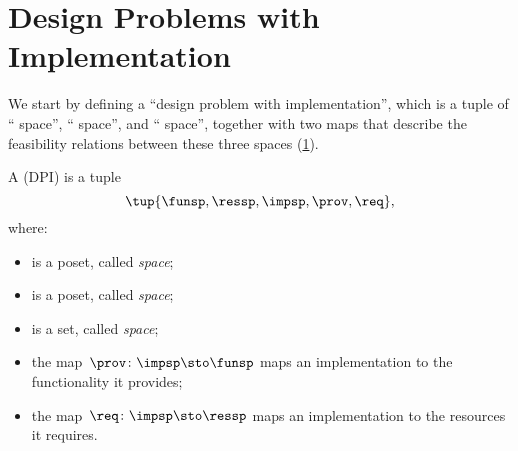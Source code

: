 
\section[DPIs]{Design Problems with Implementation}
\label{sec:Design-Problems}
We start by defining a ``design problem with implementation'', which is a tuple of `` space'', `` space'', and `` space'', together with two maps that describe the feasibility relations between these three spaces (\cref{fig:setup}).

\begin{definition}
    \label{def:DPI}
    A  (DPI) is a tuple
    \begin{equation}
        \tup{\funsp, \ressp, \impsp, \prov, \req},
    \end{equation}
    where:
    \begin{itemize}
        \item \funsp is a poset, called \emph{ space};
        \item \ressp is a poset, called \emph{ space};
        \item \impsp is a set, called \emph{ space};
        \item the map~$\prov\colon\impsp\sto\funsp$
              maps an implementation to the functionality it provides;
        \item the map~$\req\colon\impsp\sto\ressp$
              maps an implementation to the resources it requires.
    \end{itemize}

\end{definition}

\begin{figure}[h!]
    \centering
    \caption{}
    \label{fig:setup}
\end{figure}

